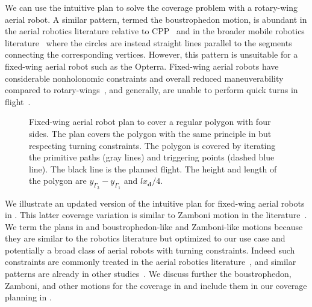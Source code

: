 We can use the intuitive plan to solve the coverage problem with a rotary-wing aerial robot. A similar pattern, termed the boustrophedon motion, is abundant in the aerial robotics literature relative to CPP~\citep{difranco2015energy,araujo2013multiple,artemenko2016energy,cabreira2018energy} and in the broader mobile robotics literature~\citep{choset2005principles,lavalle2006planning,choset2001coverage} where the circles are instead straight lines parallel to the segments connecting the corresponding vertices. However, this pattern is unsuitable for a fixed-wing aerial robot such as the Opterra. Fixed-wing aerial robots have considerable nonholonomic constraints and overall reduced maneuverability compared to rotary-wings~\citep{dille2013efficient,mannadiar2010optimal,xu2011optimal,xu2014efficient}, and generally, are unable to perform quick turns in flight~\citep{wang2017curvature}. 
\begin{figure}[h!]
  \centering
  
  \caption[Fixed-wing aerial robot plan to cover a regular polygon with four sides]{Fixed-wing aerial robot plan to cover a regular polygon with four sides. The plan covers the polygon with the same principle in  but respecting turning constraints. The polygon is covered by iterating the primitive paths (gray lines) and triggering points (dashed blue line). The black line is the planned flight. The height and length of the polygon are $y_{\Gamma_3}-y_{\Gamma_1}$ and $lx_\mathbf{d}/4$.}
  \label{fig:zambo-like_pb}
\end{figure}
We illustrate an updated version of the intuitive plan for fixed-wing aerial robots in . This latter coverage variation is similar to Zamboni motion in the literature~\citep{araujo2013multiple}. 
We term the plans in  and  boustrophedon-like and Zamboni-like motions because they are similar to the robotics literature but optimized to our use case and potentially a broad class of aerial robots with turning constraints. Indeed such constraints are commonly treated in the aerial robotics literature~\citep{artemenko2016energy,li2011coverage,xu2011optimal,xu2014efficient}, and similar patterns are already in other studies~\citep{huang2001optimal,xu2014efficient}. We discuss further the boustrophedon, Zamboni, and other motions for the coverage in  and include them in our coverage planning in . 

